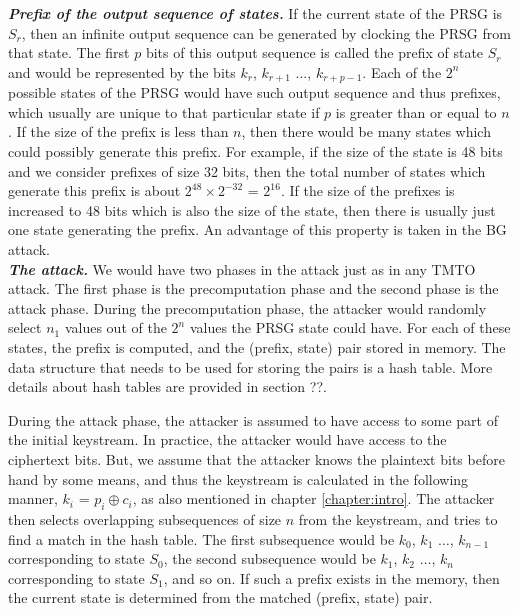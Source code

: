 \textit{\textbf{Prefix of the output sequence of states.}} If the current state of the PRSG is $S_r$, then an infinite output sequence can be generated by clocking the PRSG from that state. The first $p$ bits of this output sequence is called the prefix of state $S_r$ and would be represented by the bits $k_r$, $k_{r+1}$ $\ldots$, $k_{r+p-1}$. Each of the $2^n$ possible states of the PRSG would have such output sequence and thus prefixes, which usually are unique to that particular state if $p$ is greater than or equal to $n$ \cite{biryukov2000rtc}. If the size of the prefix is less than $n$, then there would be many states which could possibly generate this prefix. For example, if the size of the state is 48 bits and we consider prefixes of size 32 bits, then the total number of states which generate this prefix is about $2^{48} \times 2^{-32}$ = $2^{16}$. If the size of the prefixes is increased to 48 bits which is also the size of the state, then there is usually just one state generating the prefix. An advantage of this property is taken in the BG attack.\\

\textit{\textbf{The attack.}} We would have two phases in the attack just as in any TMTO attack. The first phase is the precomputation phase and the second phase is the attack phase. During the precomputation phase, the attacker would randomly select $n_1$ values out of the $2^n$ values the PRSG state could have. For each of these states, the prefix is computed, and the (prefix, state) pair stored in memory. The data structure that needs to be used for storing the pairs is a hash table. More details about hash tables are provided in section ??.

During the attack phase, the attacker is assumed to have access to some part of the initial keystream. In practice, the attacker would have access to the ciphertext bits. But, we assume that the attacker knows the plaintext bits before hand by some means, and thus the keystream is calculated in the following manner, $k_i$ = $p_i \oplus c_i$, as also mentioned in chapter \ref{chapter:intro}. The attacker then selects overlapping subsequences of size $n$ from the keystream, and tries to find a match in the hash table. The first subsequence would be $k_0$, $k_1$ $\ldots$, $k_{n-1}$ corresponding to state $S_0$, the second subsequence would be $k_1$, $k_2$ $\ldots$, $k_{n}$ corresponding to state $S_1$, and so on. If such a prefix exists in the memory, then the current state is determined from the matched (prefix, state) pair.\\

